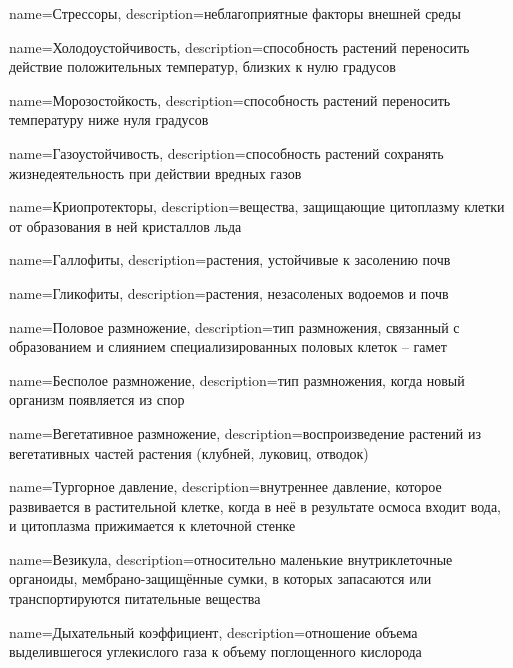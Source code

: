 {
name={Стрессоры},
description={неблагоприятные факторы внешней среды}
}

{
name={Холодоустойчивость},
description={способность растений переносить действие положительных температур, близких к нулю градусов}
}

{
name={Морозостойкость},
description={способность растений переносить температуру ниже нуля градусов}
}

{
name={Газоустойчивость},
description={способность растений сохранять жизнедеятельность при действии вредных газов}
}

{
name={Криопротекторы},
description={вещества, защищающие цитоплазму клетки от образования в ней кристаллов льда}
}

{
name={Галлофиты},
description={растения, устойчивые к засолению почв}
}

{
name={Гликофиты},
description={растения, незасоленых водоемов и почв}
}

{
name={Половое размножение},
description={тип размножения, связанный с образованием и слиянием специализированных половых клеток -- гамет}
}

{
name={Бесполое размножение},
description={тип размножения, когда новый организм появляется из спор}
}

{
name={Вегетативное размножение},
description={воспроизведение растений из вегетативных частей растения (клубней, луковиц, отводок)}
}

{
name={Тургорное давление},
description={внутреннее давление, которое развивается в растительной клетке, когда в неё в результате осмоса входит вода, и цитоплазма прижимается к клеточной стенке}
}

{
name={Везикула},
description={относительно маленькие внутриклеточные органоиды, мембрано-защищённые сумки, в которых запасаются или транспортируются питательные вещества}
}

{
name={Дыхательный коэффициент},
description={отношение объема выделившегося углекислого газа к объему поглощенного кислорода}
}

